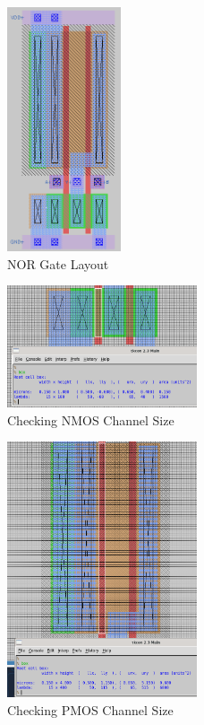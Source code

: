 \documentclass{article}
\begin{document}
	\begin{figure}[H]
		\centerline{\includegraphics[width=0.3\textwidth]{nor_layout.png}}
		\caption{NOR Gate Layout}
		\label{fig::nor_layout}
	\end{figure}
	
	\begin{figure}[H]
		\centerline{\includegraphics[width=0.5\textwidth]{nor_nmos_channel_sizing.png}}
		\caption{Checking NMOS Channel Size}
		\label{fig::nor_nmos_channel_sizing}
	\end{figure}
	
	\begin{figure}[H]
		\centerline{\includegraphics[width=0.5\textwidth]{nor_pmos_channel_sizing.png}}
		\caption{Checking PMOS Channel Size}
		\label{fig::nor_pmos_channel_sizing}
	\end{figure}
	
\end{document}
